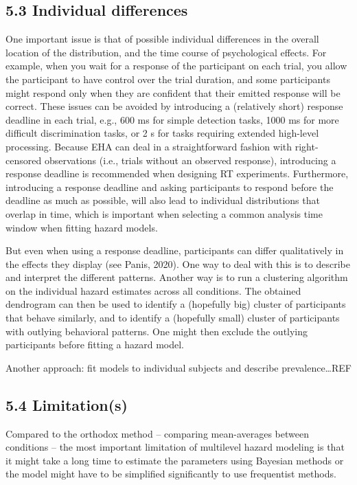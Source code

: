 \documentclass[
  man,floatsintext]{apa6}
\begin{document}
\subsection{5.3 Individual differences}\label{individual-differences}

One important issue is that of possible individual differences in the overall location of the distribution, and the time course of psychological effects. For example, when you wait for a response of the participant on each trial, you allow the participant to have control over the trial duration, and some participants might respond only when they are confident that their emitted response will be correct. These issues can be avoided by introducing a (relatively short) response deadline in each trial, e.g., 600 ms for simple detection tasks, 1000 ms for more difficult discrimination tasks, or 2 s for tasks requiring extended high-level processing. Because EHA can deal in a straightforward fashion with right-censored observations (i.e., trials without an observed response), introducing a response deadline is recommended when designing RT experiments. Furthermore, introducing a response deadline and asking participants to respond before the deadline as much as possible, will also lead to individual distributions that overlap in time, which is important when selecting a common analysis time window when fitting hazard models.

But even when using a response deadline, participants can differ qualitatively in the effects they display (see Panis, 2020). One way to deal with this is to describe and interpret the different patterns. Another way is to run a clustering algorithm on the individual hazard estimates across all conditions. The obtained dendrogram can then be used to identify a (hopefully big) cluster of participants that behave similarly, and to identify a (hopefully small) cluster of participants with outlying behavioral patterns. One might then exclude the outlying participants before fitting a hazard model.

Another approach: fit models to individual subjects and describe prevalence\ldots REF

\subsection{5.4 Limitation(s)}\label{limitations}

Compared to the orthodox method -- comparing mean-averages between conditions -- the most important limitation of multilevel hazard modeling is that it might take a long time to estimate the parameters using Bayesian methods or the model might have to be simplified significantly to use frequentist methods.
\end{document}
